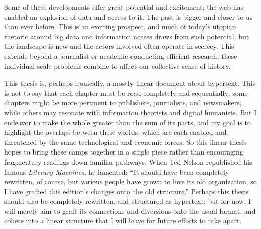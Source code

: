Some of these developments offer great potential and excitement; the web has enabled an explosion of data and access to it. The past is bigger and closer to us than ever before. This is an exciting prospect, and much of today's utopian rhetoric around big data and information access draws from such potential; but the landscape is new and the actors involved often operate in secrecy. This extends beyond a journalist or academic conducting efficient research; these individual-scale problems combine to affect our collective sense of history.


This thesis is, perhaps ironically, a mostly linear document about hypertext. This is not to say that each chapter must be read completely and sequentially; some chapters might be more pertinent to publishers, journalists, and newsmakers, while others may resonate with information theorists and digital humanists. But I endeavor to make the whole greater than the sum of its parts, and my goal is to highlight the overlaps between these worlds, which are each enabled and threatened by the same technological and economic forces. So this linear thesis hopes to bring these camps together in a single piece rather than encouraging fragmentary readings down familiar pathways. When Ted Nelson republished his famous \emph{Literary Machines}, he lamented: ``It should have been completely rewritten, of course, but various people have grown to love its old organization, so I have grafted this edition's changes onto the old structure.''%
Perhaps this thesis should also be completely rewritten, and structured as hypertext; but for now, I will merely aim to graft its connections and diversions onto the usual format, and cohere into a linear structure that I will leave for future efforts to take apart.




